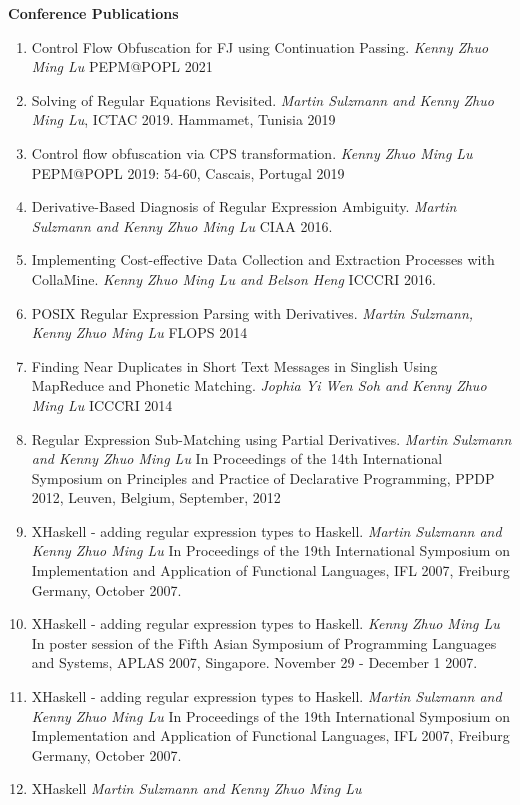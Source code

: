 \documentclass[margin,line]{res}
\begin{document}
\begin{resume}
{{\bf Conference Publications}
\begin{enumerate}
\item Control Flow Obfuscation for FJ using Continuation Passing. \textit{Kenny
    Zhuo Ming Lu}  PEPM@POPL 2021
\item  Solving of Regular Equations Revisited. \textit{Martin Sulzmann
    and Kenny Zhuo Ming Lu}, ICTAC 2019. Hammamet, Tunisia 2019  
\item Control flow obfuscation via CPS transformation. \textit{Kenny
    Zhuo Ming Lu}  PEPM@POPL 2019: 54-60, Cascais, Portugal 2019 
\item Derivative-Based Diagnosis of Regular Expression
  Ambiguity. \textit{Martin Sulzmann and Kenny Zhuo Ming Lu} CIAA 2016.
\item Implementing Cost-effective Data Collection and Extraction
  Processes with CollaMine. \textit{Kenny Zhuo Ming Lu and Belson
    Heng} ICCCRI 2016.
\item POSIX Regular Expression Parsing with Derivatives. \textit{Martin Sulzmann, Kenny Zhuo Ming Lu}  FLOPS 2014  
\item Finding Near Duplicates in Short Text Messages in Singlish Using
  MapReduce and Phonetic Matching. \textit{ Jophia Yi Wen Soh and
    Kenny Zhuo Ming Lu} ICCCRI 2014
\item Regular Expression Sub-Matching using Partial Derivatives. \textit{Martin Sulzmann and Kenny Zhuo Ming Lu} 
In Proceedings of the 14th International Symposium on Principles and Practice of Declarative Programming, PPDP 2012, Leuven, Belgium, September, 2012
\item XHaskell - adding regular expression types to Haskell. \textit{Martin Sulzmann and Kenny Zhuo Ming Lu} 
In Proceedings of the 19th International Symposium on Implementation and Application of Functional Languages, IFL 2007, Freiburg Germany, October 2007.
\item XHaskell - adding regular expression types to Haskell. \textit{Kenny Zhuo Ming Lu} 
In poster session of the Fifth Asian Symposium of Programming Languages and Systems, APLAS 2007,
Singapore. November 29 - December 1 2007.
\item XHaskell - adding regular expression types to Haskell. \textit{Martin Sulzmann and Kenny Zhuo Ming Lu} 
In Proceedings of the 19th International Symposium on Implementation and Application of Functional Languages, IFL 2007, Freiburg Germany, October 2007.
\item XHaskell \textit{Martin Sulzmann and Kenny Zhuo Ming Lu} 

\end{enumerate}}
\end{resume}
\end{document}
